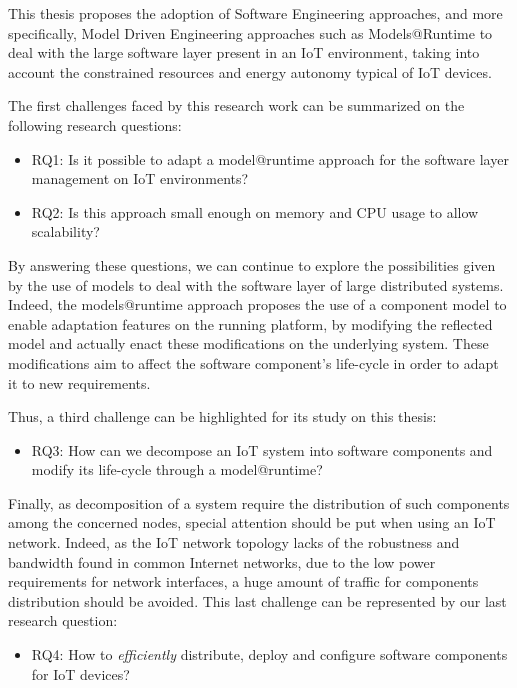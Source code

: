 This thesis proposes the adoption of Software Engineering approaches, and more specifically, Model Driven Engineering approaches such as Models@Runtime\cite{morin2010leveraging} to deal with the large software layer present in an IoT environment, taking into account the constrained resources and energy autonomy typical of IoT devices.

The first challenges faced by this research work can be summarized on the following research questions:

\begin{itemize}
	\item RQ1: Is it possible to adapt a model@runtime approach for the software layer management on IoT environments?
	\item RQ2: Is this approach small enough on memory and CPU usage to allow scalability?
\end{itemize}

By answering these questions, we can continue to explore the possibilities given by the use of models to deal with the software layer of large distributed systems.
Indeed, the models@runtime approach proposes the use of a component model to enable adaptation features on the running platform, by modifying the reflected model and actually enact these modifications on the underlying system.
These modifications aim to affect the software component's life-cycle in order to adapt it to new requirements.

Thus, a third challenge can be highlighted for its study on this thesis:

\begin{itemize}
	\item RQ3: How can we decompose an IoT system into software components and modify its life-cycle through a model@runtime?
\end{itemize}

Finally, as decomposition of a system require the distribution of such components among the concerned nodes, special attention should be put when using an IoT network.
Indeed, as the IoT network topology lacks of the robustness and bandwidth found in common Internet networks, due to the low power requirements for network interfaces, a huge amount of traffic for components distribution should be avoided.
This last challenge can be represented by our last research question:

\begin{itemize}
	\item RQ4: How to \textit{efficiently} distribute, deploy and configure software components for IoT devices?
\end{itemize}

